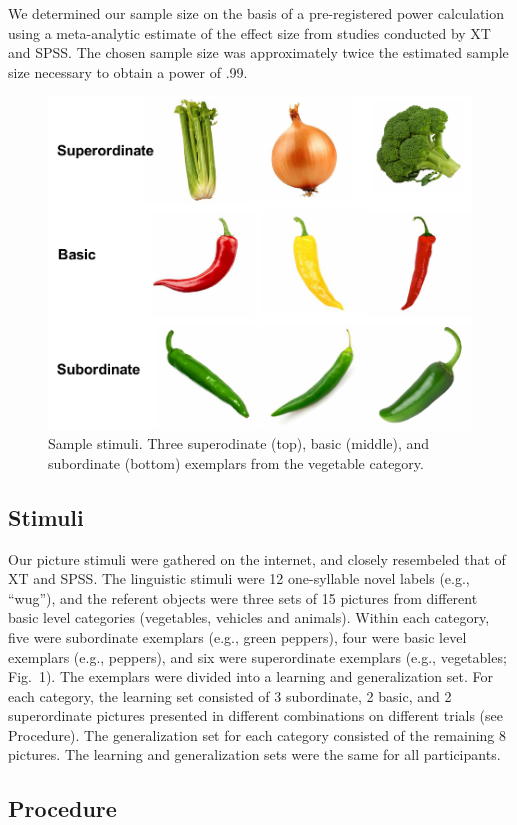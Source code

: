 \documentclass[english,floatsintext,man]{apa6}
\theoremstyle{definition}
\theoremstyle{definition}
\theoremstyle{remark}
\begin{document}
We determined our sample size on the basis of a pre-registered power
calculation using a meta-analytic estimate of the effect size from
studies conducted by XT and SPSS. The chosen sample size was
approximately twice the estimated sample size necessary to obtain a
power of .99.

\begin{figure}[t!]
 
 {\centering \includegraphics[width=0.5\linewidth]{figs/stim} 
 
 }
 
 \caption{Sample stimuli. Three superodinate (top), basic (middle), and subordinate (bottom) exemplars from the vegetable category.}\label{fig:unnamed-chunk-1}
 \end{figure}

\subsection{Stimuli}\label{stimuli}

Our picture stimuli were gathered on the internet, and closely
resembeled that of XT and SPSS. The linguistic stimuli were 12
one-syllable novel labels (e.g., \enquote{wug}), and the referent
objects were three sets of 15 pictures from different basic level
categories (vegetables, vehicles and animals). Within each category,
five were subordinate exemplars (e.g., green peppers), four were basic
level exemplars (e.g., peppers), and six were superordinate exemplars
(e.g., vegetables; Fig.~1). The exemplars were divided into a learning
and generalization set. For each category, the learning set consisted of
3 subordinate, 2 basic, and 2 superordinate pictures presented in
different combinations on different trials (see Procedure). The
generalization set for each category consisted of the remaining 8
pictures. The learning and generalization sets were the same for all
participants.

\subsection{Procedure}\label{procedure}
\end{document}
